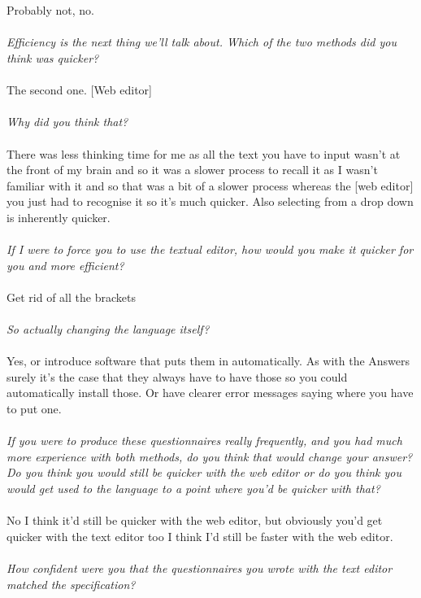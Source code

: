 \\
\\
Probably not, no.
\\
\\
\textit{Efficiency is the next thing we'll talk about. Which of the two methods did you think was quicker?}
\\
\\
The second one. [Web editor] 
\\
\\
\textit{Why did you think that?}
\\
\\
There was less thinking time for me as all the text you have to input wasn't at the front of my brain and so it was a slower process to recall it as I wasn't familiar with it and so that was a bit of a slower process whereas the [web editor] you just had to recognise it so it's much quicker. Also selecting from a drop down is inherently quicker.
\\
\\
\textit{If I were to force you to use the textual editor, how would you make it quicker for you and more efficient?}
\\
\\
Get rid of all the brackets
\\
\\
\textit{So actually changing the language itself?}
\\
\\
Yes, or introduce software that puts them in automatically. As with the Answers surely it's the case that they always have to have those so you could automatically install those. Or have clearer error messages saying where you have to put one.
\\
\\
\textit{If you were to produce these questionnaires really frequently, and you had much more experience with both methods, do you think that would change your answer? Do you think you would still be quicker with the web editor or do you think you would get used to the language to a point where you'd be quicker with that?}
\\
\\
No I think it'd still be quicker with the web editor, but obviously you'd get quicker with the text editor too I think I'd still be faster with the web editor.
\\
\\
\textit{How confident were you that the questionnaires you wrote with the text editor matched the specification?}

